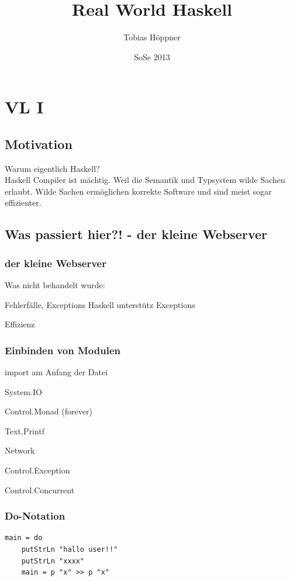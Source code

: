 \documentclass[ngerman,a4paper]{report}
\author{Tobias Höppner}
\title{Real World Haskell}
\date{SoSe 2013}
\begin{document}
\maketitle
\tableofcontents
\chapter{VL I}
\section{Motivation}
Warum eigentlich Haskell?\\
Haskell Compiler ist mächtig. Weil die Semantik und Typsystem wilde Sachen erlaubt. Wilde Sachen ermöglichen korrekte Software und sind meist sogar effizienter.\\

\section{Was passiert hier?! - der kleine Webserver}

\subsection{der kleine Webserver}



Was nicht behandelt wurde:
\begin{compactitem}
\item Fehlerfälle, Exceptions
Haskell unterstütz Exceptions 
\item Effizienz
\end{compactitem}


\subsection{Einbinden von Modulen}
import am Anfang der Datei
\begin{compactitem}
\item System.IO
\item Control.Monad (forever)
\item Text.Printf
\item Network
\item Control.Exception
\item Control.Concurrent
\end{compactitem}

\subsection{Do-Notation}
\begin{lstlisting}
main = do
	putStrLn "hallo user!!"
	putStrLn "xxxx"
	main = p "x" >> p "x"
\end{lstlisting}
\end{document}
